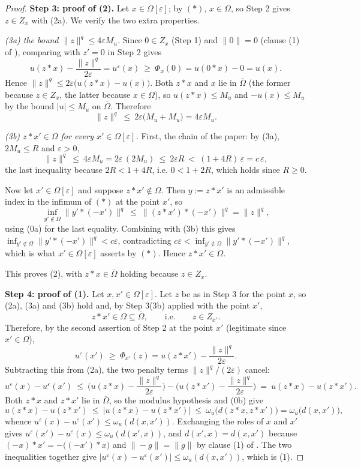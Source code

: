 \begin{proof}
\medskip\noindent\textbf{Step 3: proof of (2).} Let $x\in\Omega[\varepsilon]$; by $(\ast)$,
$x\in\Omega$, so Step 2 gives $z\in Z_x$ with (2a). We verify the two extra properties.

\emph{(3a) the bound $\|z\|^{q}\le4\varepsilon M_u$.} Since $0\in Z_x$ (Step 1) and
$\|0\|=0$ (clause (1) of ), comparing with $z'=0$ in Step 2 gives
\[
 u(z*x)-\frac{\|z\|^{q}}{2\varepsilon}=u^{\varepsilon}(x)\ \ge\ \Phi_x(0)=u(0*x)-0=u(x).
\]
Hence $\|z\|^{q}\le2\varepsilon\big(u(z*x)-u(x)\big)$. Both $z*x$ and $x$ lie in
$\overline\Omega$ (the former because $z\in Z_x$, the latter because $x\in\Omega$), so
$u(z*x)\le M_u$ and $-u(x)\le M_u$ by the bound $|u|\le M_u$ on $\overline\Omega$.
Therefore
\[
 \|z\|^{q}\ \le\ 2\varepsilon\big(M_u+M_u\big)=4\varepsilon M_u . \tag{3a}
\]

\emph{(3b) $z*x'\in\Omega$ for every $x'\in\Omega[\varepsilon]$.} First, the chain of the
paper: by (3a), $2M_u\le R$ and $\varepsilon>0$,
\[
 \|z\|^{q}\ \le\ 4\varepsilon M_u=2\varepsilon\,(2M_u)\ \le\ 2\varepsilon R
 \ <\ (1+4R)\,\varepsilon=c\,\varepsilon, \tag{3b}
\]
the last inequality because $2R<1+4R$, i.e. $0<1+2R$, which holds since $R\ge0$.

Now let $x'\in\Omega[\varepsilon]$ and suppose $z*x'\notin\Omega$. Then $y:=z*x'$ is an
admissible index in the infimum of $(\ast)$ at the point $x'$, so
\[
 \inf_{y'\notin\Omega}\big\|y'*(-x')\big\|^{q}\ \le\ \big\|(z*x')*(-x')\big\|^{q}=\|z\|^{q},
\]
using (0a) for the last equality. Combining with (3b) this gives
$\inf_{y'\notin\Omega}\|y'*(-x')\|^{q}<c\varepsilon$, contradicting
$c\varepsilon<\inf_{y'\notin\Omega}\|y'*(-x')\|^{q}$, which is what
$x'\in\Omega[\varepsilon]$ asserts by $(\ast)$. Hence $z*x'\in\Omega$.

This proves (2), with $z*x\in\overline\Omega$ holding because $z\in Z_x$.

\medskip\noindent\textbf{Step 4: proof of (1).} Let $x,x'\in\Omega[\varepsilon]$. Let $z$ be
as in Step 3 for the point $x$, so (2a), (3a) and (3b) hold and, by Step 3(3b) applied with
the point $x'$,
\[
 z*x'\in\Omega\subseteq\overline\Omega,\qquad\text{i.e.}\qquad z\in Z_{x'} .
\]
Therefore, by the second assertion of Step 2 at the point $x'$ (legitimate since
$x'\in\Omega$),
\[
 u^{\varepsilon}(x')\ \ge\ \Phi_{x'}(z)=u(z*x')-\frac{\|z\|^{q}}{2\varepsilon}.
\]
Subtracting this from (2a), the two penalty terms $\|z\|^{q}/(2\varepsilon)$ cancel:
\[
 u^{\varepsilon}(x)-u^{\varepsilon}(x')
  \ \le\ \Big(u(z*x)-\frac{\|z\|^{q}}{2\varepsilon}\Big)
         -\Big(u(z*x')-\frac{\|z\|^{q}}{2\varepsilon}\Big)
  \ =\ u(z*x)-u(z*x').
\]
Both $z*x$ and $z*x'$ lie in $\overline\Omega$, so the modulus hypothesis and (0b) give
\[
 u(z*x)-u(z*x')\ \le\ \big|u(z*x)-u(z*x')\big|
  \ \le\ \omega_u\big(d(z*x,z*x')\big)=\omega_u\big(d(x,x')\big),
\]
whence $u^{\varepsilon}(x)-u^{\varepsilon}(x')\le\omega_u(d(x,x'))$. Exchanging the roles of
$x$ and $x'$ gives $u^{\varepsilon}(x')-u^{\varepsilon}(x)\le\omega_u(d(x',x))$, and
$d(x',x)=d(x,x')$ because $(-x)*x'=-\big((-x')*x\big)$ and $\|-g\|=\|g\|$ by clause (1) of
. The two inequalities together give
$|u^{\varepsilon}(x)-u^{\varepsilon}(x')|\le\omega_u(d(x,x'))$, which is (1).


\end{proof}

